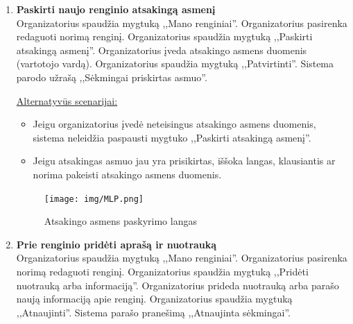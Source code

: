\documentclass{VUMIFPSkursinis}
\begin{document}
\begin{enumerate} [label = \textbf{U\arabic*.}]
				\underline{Alternatyvūs scenarijai:}
				\begin{itemize}
					\item Jeigu informacija yra neteisinga arba nepilnai užpildyta, sistema neleidžia paspausti mygtuko ,,Paskelbti renginį''.
				\end{itemize}
				
				\begin{figure}[H]
					\centering
					\texttt{[image: img/MLP.png]}
					\caption{Naujo renginio langas}
					\label{fig:paskelbti-nauja-rengini}
				\end{figure}
				\newpage
			\item \textbf{Paskirti naujo renginio atsakingą asmenį} \\
				Organizatorius spaudžia mygtuką ,,Mano renginiai''. 
				Organizatorius pasirenka redaguoti norimą renginį.
				Organizatorius spaudžia mygtuką ,,Paskirti atsakingą asmenį''. 
				Organizatorius įveda atsakingo asmens duomenis (vartotojo vardą).
				Organizatorius spaudžia mygtuką ,,Patvirtinti''.
				Sistema parodo užrašą ,,Sėkmingai priskirtas asmuo''.
				
				\underline{Alternatyvūs scenarijai:}
				\begin{itemize}
					\item Jeigu organizatorius įvedė neteisingus atsakingo asmens duomenis, sistema neleidžia paspausti mygtuko ,,Paskirti atsakingą asmenį''.
					\item Jeigu atsakingas asmuo jau yra prisikirtas, iššoka langas, klausiantis ar norima pakeisti atsakingo asmens duomenis.
				\end{itemize}
				
				\begin{figure}[H]
					\centering
					\texttt{[image: img/MLP.png]}
					\caption{Atsakingo asmens paskyrimo langas}
					\label{fig:paskirti-atsakinga-asmeni}
				\end{figure}
				
			\item \textbf{Prie renginio pridėti aprašą ir nuotrauką} \\
				Organizatorius spaudžia mygtuką ,,Mano renginiai''. 
				Organizatorius pasirenka norimą redaguoti renginį.
				Organizatorius spaudžia mygtuką ,,Pridėti nuotrauką arba informaciją''. 
				Organizatorius prideda nuotrauką arba parašo naują informaciją apie renginį.
				Organizatorius spaudžia mygtuką ,,Atnaujinti''. 
				Sistema parašo pranešimą ,,Atnaujinta sėkmingai''.
				

\end{enumerate}
\end{document}
